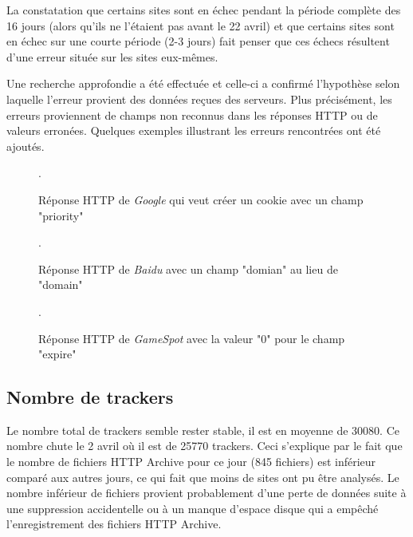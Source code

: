 La constatation que certains sites sont en échec pendant la période complète des 16 jours (alors qu'ils ne l'étaient pas avant le 22 avril) et que certains sites sont en échec sur une courte période (2-3 jours) fait penser que ces échecs résultent d'une erreur située sur les sites eux-mêmes.
\newline

Une recherche approfondie a été effectuée et celle-ci a confirmé l'hypothèse selon laquelle l'erreur provient des données reçues des serveurs. Plus précisément, les erreurs proviennent de champs non reconnus dans les réponses HTTP ou de valeurs erronées. Quelques exemples illustrant les erreurs rencontrées ont été ajoutés.
\newline

\begin{figure}[h]
	\centering
	
	\caption{\label{bad_field_google}Réponse HTTP de \textit{Google} qui veut créer un cookie avec un champ "priority"}.
\end{figure}

\begin{figure}[h]
	\centering
	
	\caption{\label{bad_field_baidu}Réponse HTTP de \textit{Baidu} avec un champ "domian" au lieu de "domain"}.
\end{figure}

\begin{figure}[h]
	\centering
	
	\caption{\label{bad_field_gamespot}Réponse HTTP de \textit{GameSpot} avec la valeur "0" pour le champ "expire"}.
\end{figure}

\subsection{Nombre de trackers}
Le nombre total de trackers semble rester stable, il est en moyenne de 30080. Ce nombre chute le 2 avril où il est de 25770 trackers. Ceci s'explique par le fait que le nombre de fichiers HTTP Archive pour ce jour (845 fichiers) est inférieur comparé aux autres jours, ce qui fait que moins de sites ont pu être analysés. Le nombre inférieur de fichiers provient probablement d'une perte de données suite à une suppression accidentelle ou à un manque d'espace disque qui a empêché l'enregistrement des fichiers HTTP Archive.

